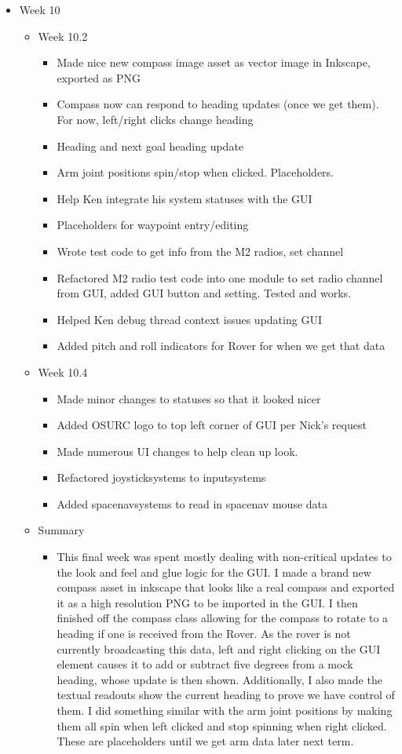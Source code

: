 \begin{itemize}
\item Week 10
	\begin{itemize}
	\item Week 10.2
      \begin{itemize}
      \item Made nice new compass image asset as vector image in Inkscape, exported as PNG 
      \item Compass now can respond to heading updates (once we get them). For now, left/right clicks change heading 
      \item Heading and next goal heading update 
      \item Arm joint positions spin/stop when clicked. Placeholders. 
      \item Help Ken integrate his system statuses with the GUI 
      \item Placeholders for waypoint entry/editing 
      \item Wrote test code to get info from the M2 radios, set channel 
      \item Refactored M2 radio test code into one module to set radio channel from GUI, added GUI button and setting. Tested and works. 
      \item Helped Ken debug thread context issues updating GUI 
      \item Added pitch and roll indicators for Rover for when we get that data 
      \end{itemize}
	\item Week 10.4
      \begin{itemize}
      \item Made minor changes to statuses so that it looked nicer 
      \item Added OSURC logo to top left corner of GUI per Nick's request 
      \item Made numerous UI changes to help clean up look. 
      \item Refactored joysticksystems to inputsystems 
      \item Added spacenavsystems to read in spacenav mouse data 
      \end{itemize}
    
    \item Summary
      \begin{itemize}
      \item This final week was spent mostly dealing with non-critical updates to the look and feel and glue logic for the GUI. I made a brand new compass asset in inkscape that looks like a real compass and exported it as a high resolution PNG to be imported in the GUI. I then finished off the compass class allowing for the compass to rotate to a heading if one is received from the Rover. As the rover is not currently broadcasting this data, left and right clicking on the GUI element causes it to add or subtract five degrees from a mock heading, whose update is then shown. Additionally, I also made the textual readouts show the current heading to prove we have control of them. I did something similar with the arm joint positions by making them all spin when left clicked and stop spinning when right clicked. These are placeholders until we get arm data later next term.  


\end{itemize}
\end{itemize}
\end{itemize}
